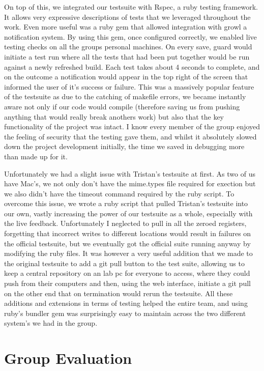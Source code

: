 \documentclass[11pt]{article}
\begin{document}
On top of this, we integrated our testsuite with Rspec, a ruby testing framework. It allows very expressive descriptions of tests that we leveraged throughout the work. Even more useful was a ruby gem that allowed integration with growl a notification system. By using this gem, once configured correctly, we enabled live testing checks on all the groups personal machines. On every save, guard would initiate a test run where all the tests that had been put together would be run against a newly refreshed build. Each test takes about 4 seconds to complete, and on the outcome a notification would appear in the top right of the screen that informed the user of it's success or failure. This was a massively popular feature of the testsuite as due to the catching of makefile errors, we became instantly aware not only if our code would compile (therefore saving us from pushing anything that would really break anothers work) but also that the key functionality of the project was intact. I know every member of the group enjoyed the feeling of security that the testing gave them, and whilst it absolutely slowed down the project development initially, the time we saved in debugging more than made up for it.

Unfortunately we had a slight issue with Tristan's testsuite at first. As two of us have Mac's, we not only don't have the mime.types file required for exection but we also didn't have the timeout command required by the ruby script. To overcome this issue, we wrote a ruby script that pulled Tristan's testsuite into our own, vastly increasing the power of our testsuite as a whole, especially with the live feedback. Unfortunately I neglected to pull in all the zeroed registers, forgetting that incorrect writes to different locations would result in failures on the official testsuite, but we eventually got the official suite running anyway by modifying the ruby files. It was however a very useful addition that we made to the original testsuite to add a git pull button to the test suite, allowing us to keep a central repository on an lab pc for everyone to access, where they could push from their computers and then, using the web interface, initiate a git pull on the other end that on termination would rerun the testsuite. All these additions and extensions in terms of testing helped the entire team, and using ruby's bundler gem was surprisingly easy to maintain across the two different system's we had in the group.

\section{Group Evaluation}
\end{document}
